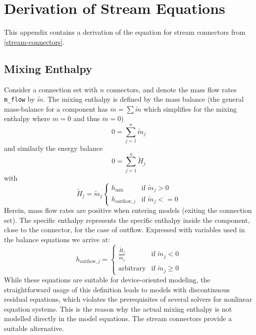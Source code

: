 \chapter{Derivation of Stream Equations}\label{derivation-of-stream-equations}

This appendix contains a derivation of the equation for stream connectors from \cref{stream-connectors}.

\section{Mixing Enthalpy}\label{reasons-for-avoiding-the-actual-mixing-enthalpy-in-connector-definitions}\label{mixing-enthalpy}

Consider a connection set with $n$ connectors, and denote the mass flow rates \lstinline!m_flow! by $\tilde{m}$.
The mixing enthalpy is defined by the mass balance (the general mass-balance for a component has $\dot{m}=\sum\tilde{m}$ which simplifies for the mixing enthalpy where $m=0$ and thus $\dot{m}=0$)
\begin{equation*}
0=\sum_{j=1}^n\tilde{m}_j
\end{equation*}
and similarly the energy balance
\begin{equation*}
0=\sum_{j=1}^n\tilde{H}_j
\end{equation*}
with
\begin{equation*}
\tilde{H}_j=\tilde{m}_j
\begin{cases}
h_{\mathrm{mix}}&\text{if $\tilde{m}_j>0$}\\
h_{\mathrm{outflow},j}&\text{if $\tilde{m}_j<=0$}
\end{cases}
\end{equation*}
Herein, mass flow rates are positive when entering models (exiting the connection set).
The specific enthalpy represents the specific enthalpy inside the component, close to the connector, for the case of outflow.
Expressed with variables used in the balance equations we arrive at:
\begin{equation*}
h_{\mathrm{outflow},j}=
\begin{cases}
\frac{\tilde{H}_j}{\tilde{m}_j}&\text{if $\tilde{m}_j<0$}\\
\textrm{arbitrary}&\text{if $\tilde{m}_j \geq 0$}
\end{cases}
\end{equation*}
While these equations are suitable for device-oriented modeling, the straightforward usage of this definition leads to models with discontinuous residual equations, which violates the prerequisites of several solvers for nonlinear equation systems.
This is the reason why the actual mixing enthalpy is not modelled directly in the model equations.
The stream connectors provide a suitable alternative.

